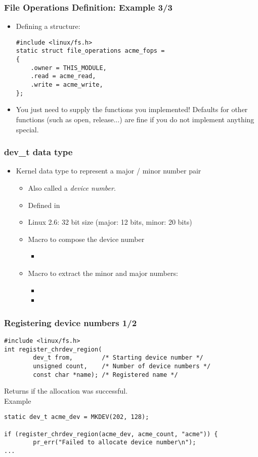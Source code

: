 \begin{frame}[fragile]
  \frametitle{File Operations Definition: Example 3/3}
  \begin{itemize}
  \item Defining a  structure:
\begin{verbatim}
#include <linux/fs.h>
static struct file_operations acme_fops =
{
    .owner = THIS_MODULE,
    .read = acme_read,
    .write = acme_write,
};
\end{verbatim}
  \item You just need to supply the functions you implemented!
    Defaults for other functions (such as open, release...) are fine
    if you do not implement anything special.
  \end{itemize}
\end{frame}

\begin{frame}
  \frametitle{dev\_t data type}
  \begin{itemize}
  \item Kernel data type to represent a major / minor number pair
    \begin{itemize}
    \item Also called a \emph{device number}.
    \item Defined in 
    \item Linux 2.6: 32 bit size (major: 12 bits, minor: 20 bits)
    \item Macro to compose the device number
      \begin{itemize}
      \item {}
      \end{itemize}
    \item Macro to extract the minor and major numbers:
      \begin{itemize}
      \item {}
      \item {}
      \end{itemize}
  \end{itemize}
\end{itemize}
\end{frame}

\begin{frame}[fragile]
  \frametitle{Registering device numbers 1/2}
\begin{verbatim}
#include <linux/fs.h>
int register_chrdev_region(
        dev_t from,        /* Starting device number */
        unsigned count,    /* Number of device numbers */
        const char *name); /* Registered name */
\end{verbatim}
Returns  if the allocation was successful.\\
Example
\begin{verbatim}
static dev_t acme_dev = MKDEV(202, 128);

if (register_chrdev_region(acme_dev, acme_count, "acme")) {
        pr_err("Failed to allocate device number\n");
...
\end{verbatim}
\end{frame}

